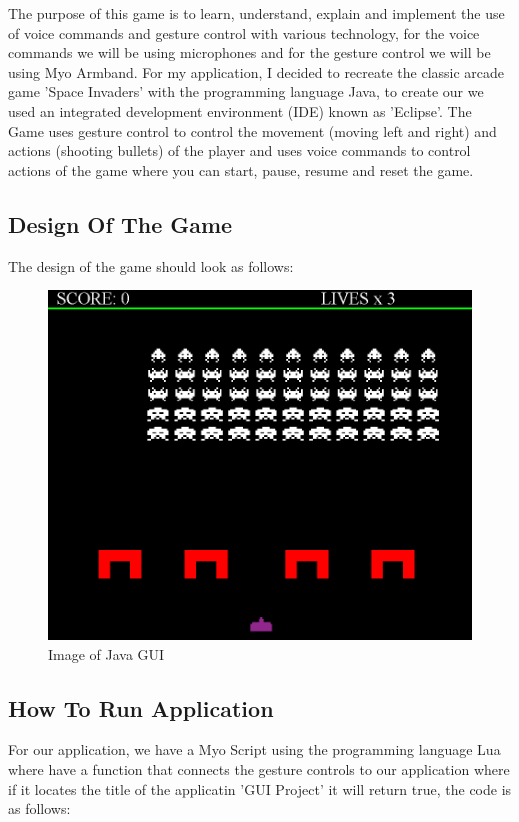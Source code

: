 \documentclass{article}
\begin{document}
The purpose of this game is to learn, understand, explain and implement the use of voice commands and gesture control with various technology, for the voice commands we will be using microphones and for the gesture control we will be using Myo Armband. For my application, I decided to recreate the classic arcade game 'Space Invaders' with the programming language Java, to create our we used an integrated development environment (IDE) known as 'Eclipse'. The Game uses gesture control to control the movement (moving left and right) and actions (shooting bullets) of the player and uses voice commands to control actions of the game where you can start, pause, resume and reset the game.

\subsection{Design Of The Game}

The design of the game should look as follows:
\begin{figure}[h]
  \includegraphics[scale=0.25]{img/gamescreen.png}
  \centering
  \caption{Image of Java GUI}
  \label{fig: In Game Screen}
\end{figure}

\subsection{How To Run Application}

For our application, we have a Myo Script using the programming language Lua where have a function that connects the gesture controls to our application where if it locates the title of the applicatin 'GUI Project' it will return true, the code is as follows:
\end{document}
